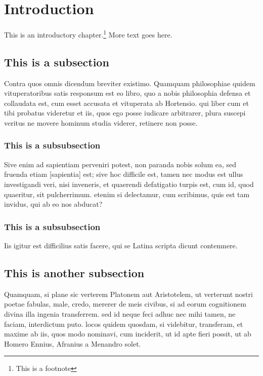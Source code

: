 % 

\section{Introduction}
\label{introduction}


This is an introductory chapter.\footnote{This is a footnote}  More text goes here.


\subsection{This is a subsection}
Contra quos omnis dicendum breviter existimo. Quamquam philosophiae quidem vituperatoribus satis responsum est eo libro, quo a nobis philosophia defensa et collaudata est, cum esset accusata et vituperata ab Hortensio. qui liber cum et tibi probatus videretur et iis, quos ego posse iudicare arbitrarer, plura suscepi veritus ne movere hominum studia viderer, retinere non posse. 

\subsubsection{This is a subsubsection}
Sive enim ad sapientiam perveniri potest, non paranda nobis solum ea, sed fruenda etiam [sapientia] est; sive hoc difficile est, tamen nec modus est ullus investigandi veri, nisi inveneris, et quaerendi defatigatio turpis est, cum id, quod quaeritur, sit pulcherrimum. etenim si delectamur, cum scribimus, quis est tam invidus, qui ab eo nos abducat? 

\subsubsection{This is a subsubsection}
Iis igitur est difficilius satis facere, qui se Latina scripta dicunt contemnere. 

\subsection{This is another subsection}
Quamquam, si plane sic verterem Platonem aut Aristotelem, ut verterunt nostri poetae fabulas, male, credo, mererer de meis civibus, si ad eorum cognitionem divina illa ingenia transferrem. sed id neque feci adhuc nec mihi tamen, ne faciam, interdictum puto. locos quidem quosdam, si videbitur, transferam, et maxime ab iis, quos modo nominavi, cum inciderit, ut id apte fieri possit, ut ab Homero Ennius, Afranius a Menandro solet. 

